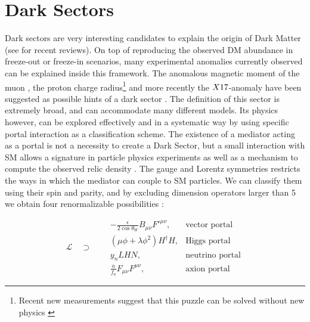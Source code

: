 \section{Dark Sectors}
\label{ch1:sec:dm-sector}

Dark sectors are very interesting candidates to explain the origin of Dark Matter (see \cite{battaglieri2017cosmic,alex2016dark} for recent reviews). On top of reproducing the observed DM abundance in freeze-out or freeze-in scenarios, many experimental anomalies currently observed can be explained inside this framework. The anomalous magnetic moment of the muon \cite{blum2013muon}, the proton charge radius\footnote{Recent new measurements suggest that this puzzle can be solved without new physics \cite{Karshenboim2019}} \cite{Pohl2010} and more recently the $X17$-anomaly \cite{Krasznahorkay:2015iga,Krasznahorkay:2019lyl} have been suggested as possible hints of a dark sector \cite{alex2016dark}. The definition of this sector is extremely broad, and can accommodate many different models. Its physics however, can be explored effectively and in a systematic way by using specific portal interaction as a classification scheme.  The existence of a mediator acting as a portal is not a necessity to create a Dark Sector, but a small interaction with SM allows a signature in particle physics experiments as well as a mechanism to compute the observed relic density \cite{prw, pospelov}. The gauge and Lorentz symmetries restricts the ways in which the mediator can couple to SM particles. We can classify them using their spin and parity, and by excluding dimension operators larger than 5 we obtain four renormalizable possibilities \cite{alex2016dark}:

\begin{equation}
  \label{eq:dm-portals}
  \mathcal{L} \quad \supset \quad
\begin{aligned}
  &-\frac{\epsilon}{2 \cos{\theta_W}}B_{\mu \nu}F'^{\mu \nu}, &\textrm{vector portal}\\
  & (\mu \phi + \lambda \phi^2)H^{\dagger}H, &\textrm{Higgs portal}\\
  &y_n LHN, &\textrm{neutrino portal} \\
  &\frac{a}{f_a} F_{\mu \nu} F^{\mu \nu}, &\textrm{axion portal}
\end{aligned}
\end{equation}


